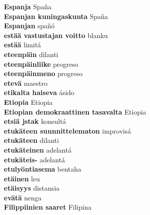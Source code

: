 \textbf{ Espanja  } Spaña \\
\textbf{ Espanjan kuningaskunta  } Spaña \\
\textbf{ Espanjan  } spañó \\
\textbf{ estää vastustajan voitto  } blanku \\
\textbf{ estää  } limitá \\
\textbf{ eteenpäin  } dilanti \\
\textbf{ eteenpäinliike  } progreso \\
\textbf{ eteenpäinmeno  } progreso \\
\textbf{ etevä  } maestro \\
\textbf{ etikalta haiseva  } ásido \\
\textbf{ Etiopia  } Etiopia \\
\textbf{ Etiopian demokraattinen tasavalta  } Etiopia \\
\textbf{ etsiä jstak  } konsultá \\
\textbf{ etukäteen suunnittelematon  } improvisá \\
\textbf{ etukäteen  } dilanti \\
\textbf{ etukäteinen  } adelantá \\
\textbf{ etukäteis-  } adelantá \\
\textbf{ etulyöntiasema  } bentaha \\
\textbf{ etäinen  } leu \\
\textbf{ etäisyys  } distansia \\
\textbf{ evätä  } nenga \\
\textbf{ Filippiinien saaret  } Filipina \\
